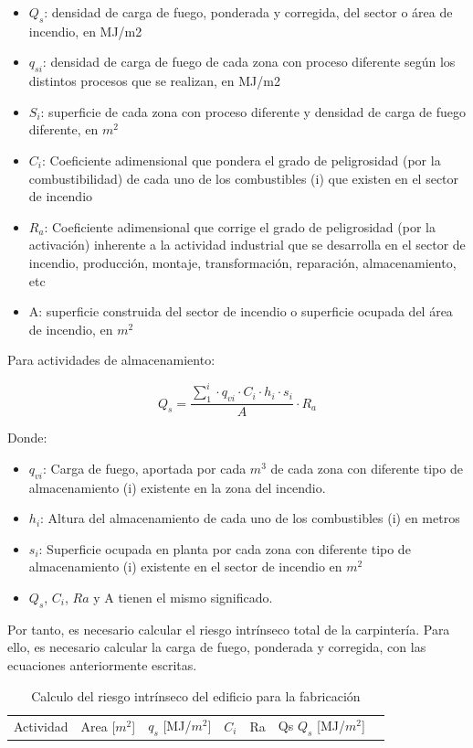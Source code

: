 \documentclass[../main.tex]{subfiles}
\begin{document}
\begin{itemize}
    \item $Q_s$: densidad de carga de fuego, ponderada y corregida, del sector o área de incendio, en MJ/m2
    \item $q_{si}$: densidad de carga de fuego de cada zona con proceso diferente según los distintos procesos que se realizan, en MJ/m2
    \item $S_i$: superficie de cada zona con proceso diferente y densidad de carga de fuego diferente, en $m^2$
    \item $C_i$: Coeficiente adimensional que pondera el grado de peligrosidad (por la combustibilidad) de cada uno de los combustibles (i) que existen en el sector de incendio
    \item $R_a$: Coeficiente adimensional que corrige el grado de peligrosidad (por la activación) inherente a la actividad industrial que se desarrolla en el sector de incendio, producción, montaje, transformación, reparación, almacenamiento, etc
    \item A: superficie construida del sector de incendio o superficie ocupada del área de incendio, en $m^2$
    
\end{itemize}

Para actividades de almacenamiento:

\begin{equation}
    Q_s = \frac{\sum_{1}^{i} \cdot q_{vi} \cdot C_i \cdot h_i \cdot s_i }{A} \cdot R_a
\end{equation}

Donde:

\begin{itemize}
    \item $q_{vi}$: Carga de fuego, aportada por cada $m^3$ de cada zona con diferente tipo de almacenamiento (i) existente en la zona del incendio.
    \item $h_i$: Altura del almacenamiento de cada uno de los combustibles (i) en metros
    \item $s_i$: Superficie ocupada en planta por cada zona con diferente tipo de almacenamiento (i) existente en el sector de incendio en $m^2$
    \item $Q_s$, $C_i$, $Ra$ y A tienen el mismo significado.
\end{itemize}

Por tanto, es necesario calcular el riesgo intrínseco total de la carpintería. Para ello, es necesario calcular la carga de fuego, ponderada y corregida, con las ecuaciones anteriormente escritas.



\begin{table}[H]
    \centering
    \begin{tabular}{c|c|c|c|c|c|c}
    Actividad & Area [$m^2$] & $q_s$ [MJ/$m^2$] & $C_i$ & Ra & Qs $Q_s$ [MJ/$m^2$]
    \end{tabular}
    \caption{Calculo del riesgo intrínseco del edificio para la fabricación}
\end{table}
\end{document}
